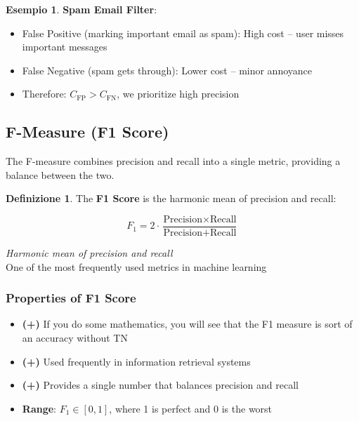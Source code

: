 \documentclass[11pt,a4paper]{article}
\theoremstyle{definition}
\newtheorem{definition}{Definizione}[section]
\newtheorem{example}{Esempio}[section]
\theoremstyle{plain}
\theoremstyle{remark}
\begin{document}
\begin{example}
\textbf{Spam Email Filter}:
\begin{itemize}
    \item False Positive (marking important email as spam): High cost – user misses important messages
    \item False Negative (spam gets through): Lower cost – minor annoyance
    \item Therefore: $C_{\text{FP}} > C_{\text{FN}}$, we prioritize high precision
\end{itemize}
\end{example}

\subsection{F-Measure (F1 Score)}

The F-measure combines precision and recall into a single metric, providing a balance between the two.

\begin{definition}
The \textbf{F1 Score} is the harmonic mean of precision and recall:

\begin{equation}
F_1 = 2 \cdot \frac{\text{Precision} \times \text{Recall}}{\text{Precision} + \text{Recall}}
\end{equation}
\end{definition}

\begin{center}
\colorbox{green!15}{\parbox{0.8\textwidth}{
\centering
\textit{Harmonic mean of precision and recall}\\[0.1cm]
One of the most frequently used metrics in machine learning
}}
\end{center}

\subsubsection{Properties of F1 Score}

\begin{itemize}
    \item \textbf{(+)} If you do some mathematics, you will see that the F1 measure is sort of an accuracy without TN
    \item \textbf{(+)} Used frequently in information retrieval systems
    \item \textbf{(+)} Provides a single number that balances precision and recall
    \item \textbf{Range}: $F_1 \in [0, 1]$, where 1 is perfect and 0 is the worst
\end{itemize}
\end{document}

